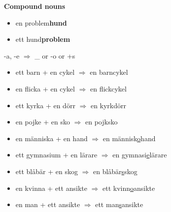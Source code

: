 
\begin{flushleft}
    \textbf{Compound nouns}
    \begin{itemize}
        \item en problem\textbf{hund}
        \item ett hund\textbf{problem}
    \end{itemize}

    -a, -e $\Rightarrow$ \_ or -o or +s
    \begin{itemize}
        \item ett barn + en cykel $\Rightarrow$ en barncykel
        \item en flicka + en cykel $\Rightarrow$ en flickcykel
        \item ett kyrka + en dörr $\Rightarrow$ en kyrkdörr
        \item en pojke + en sko $\Rightarrow$ en pojksko
        \item en människa + en hand $\Rightarrow$ en människ\underline{o}hand
        \item ett gymnasium + en lärare $\Rightarrow$ en gymnasi\underline{e}lärare
        \item ett blåbär + en skog $\Rightarrow$ en blåbär\underline{s}skog
        \item en kvinna + ett ansikte $\Rightarrow$ ett kvinn\underline{o}ansikte
        \item en man + ett ansikte $\Rightarrow$ ett man\underline{s}ansikte
    \end{itemize}
\end{flushleft}

